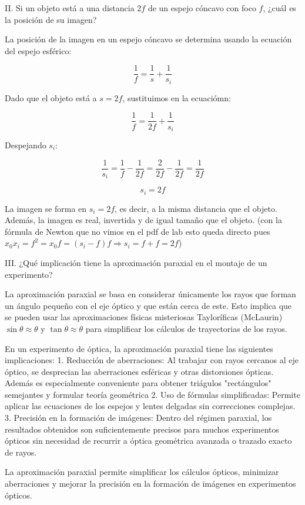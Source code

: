 \documentclass{article}
\begin{document}
II. Si un objeto está a una distancia \( 2f \) de un espejo cóncavo con foco \( f \), ¿cuál es la posición de su imagen?  
  
La posición de la imagen en un espejo cóncavo se determina usando la ecuación del espejo esférico:

\[
\frac{1}{f} = \frac{1}{s} + \frac{1}{s_i}
\]

Dado que el objeto está a \( s = 2f \), sustituimos en la ecuaciómn:  

\[
\frac{1}{f} = \frac{1}{2f} + \frac{1}{s_i}
\]

Despejando \( s_i \):  

\[
\frac{1}{s_i} = \frac{1}{f} - \frac{1}{2f} = \frac{2}{2f} - \frac{1}{2f} = \frac{1}{2f}
\]

\[
s_i = 2f
\]

La imagen se forma en \( s_i = 2f \), es decir, a la misma distancia que el objeto. Además, la imagen es real, invertida y de igual tamaño que el objeto. (con la fórmula de Newton que no vimos en el pdf de lab esto queda directo pues $x_0x_i=f^2 =x_0f=(s_i-f)f \Rightarrow s_i=f+f=2f$)

III. ¿Qué implicación tiene la aproximación paraxial en el montaje de un experimento?  
 
La aproximación paraxial se basa en considerar únicamente los rayos que forman un ángulo pequeño con el eje óptico y que están cerca de este. Esto implica que se pueden usar las aproximaciones físicas misteriosas Tayloríficas (McLaurin) \( \sin \theta \approx \theta \) y \( \tan \theta \approx \theta \) para simplificar los cálculos de trayectorias de los rayos.  

En un experimento de óptica, la aproximación paraxial tiene las siguientes implicaciones:  
1. Reducción de aberraciones: Al trabajar con rayos cercanos al eje óptico, se desprecian las aberraciones esféricas y otras distorsiones ópticas. Además es especialmente conveniente para obtener triágulos "rectángulos" semejantes y formular teoría geométrica  
2. Uso de fórmulas simplificadas: Permite aplicar las ecuaciones de los espejos y lentes delgadas sin correcciones complejas.  
3. Precisión en la formación de imágenes: Dentro del régimen paraxial, los resultados obtenidos son suficientemente precisos para muchos experimentos ópticos sin necesidad de recurrir a óptica geométrica avanzada o trazado exacto de rayos.  

La aproximación paraxial permite simplificar los cálculos ópticos, minimizar aberraciones y mejorar la precisión en la formación de imágenes en experimentos ópticos.
\end{document}
